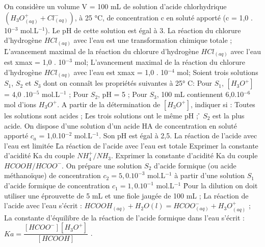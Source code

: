 \q	
   On considère un volume V = 100 mL de solution d'acide chlorhydrique $(H_3O^+_{(aq)} + Cl^-_{(aq)})$, à 25 °C, de concentration c en soluté apporté (c = 1,0 . 10$^{-3}$ mol.L$^{-1}$). Le pH de cette solution est égal à 3. 
\rv
  La réaction du chlorure d'hydrogène $HCl_{(aq)}$ avec l'eau est une transformation chimique totale ;
\r
  L'avancement maximal de la réaction du chlorure d’hydrogène $HCl_{(aq)}$ avec l'eau est xmax = 1,0 . 10$^{-3}$ mol;
  \rv
  L'avancement maximal de la réaction du chlorure d’hydrogène $HCl_{(aq)}$ avec l'eau est xmax = 1,0 . 10$^{-4}$ mol;
 \q	
Soient trois solutions $S_1$, $S_2$ et $S_3$ dont on connaît les propriétés suivantes à 25° C:
Pour $S_1$, $[H_3O^+]$ = 4,0 .10$^{-5}$ mol.L$^{-1}$ ;
Pour $S_2$, pH = 5 ;
Pour $S_3$, 100 mL contiennent 6,0.10$^{-6}$ mol d’ions $H_3O^+$.
A partir de la détermination de $[H_3O^+]$, indiquer si :
\rv
Toutes les solutions sont acides ;
\r
Les trois solutions ont le même pH ;
\r
$S_2$ est la plus acide.
\q	
On dispose d’une solution d’un acide HA de concentration en soluté apporté $c_a$ = 1,0.10$^{-2}$  mol.L$^{-1}$. Son pH est égal à  2,5.
\rv
La réaction de l’acide avec l’eau est limitée 
\r
La réaction de l’acide avec l’eau est totale
\q	
Exprimer la constante d’acidité Ka du couple $NH_4^+/ NH_3$.
\q	Exprimer la constante d’acidité Ka du couple $HCOOH/HCOO^{-}$.
   \q	
On prépare une solution $S_2$ d’acide formique (ou acide méthanoïque) de concentration        $c_2 = 5,0 . 10^{-3}$ mol.L$^{-1}$ à partir d’une solution $S_1$ d’acide formique de concentration $c_1 =1,0 . 10^{-1}$ mol.L$^{-1}$ 
\r
Pour la dilution on doit utiliser une éprouvette de 5 mL et une fiole jaugée de 100 mL ;
\rv 
La réaction de l’acide avec l’eau s’écrit :
$HCOOH_{(aq)}+H_2O(l) = HCOO^{-} _{(aq)}+ H_3O^+ _{(aq)}$ ;
\rv
La constante d’équilibre de la réaction de l’acide formique dans l’eau s’écrit :
$Ka=\dfrac{[HCOO^{-}][H_3O^+]}{[HCOOH]}$   .

  
